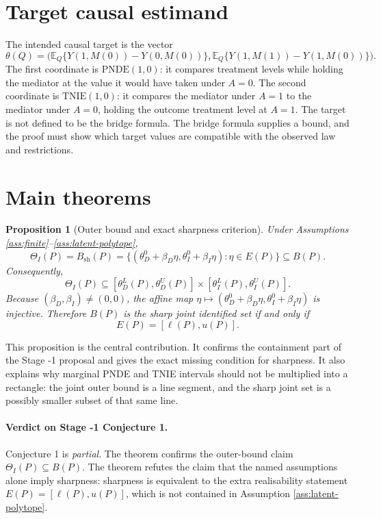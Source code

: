 \documentclass[11pt]{article}
\newcommand{\E}{\mathbb{E}}
\theoremstyle{definition}
\theoremstyle{plain}
\newtheorem{proposition}{Proposition}
\theoremstyle{remark}
\begin{document}
\section{Target causal estimand}
The intended causal target is the vector
\[
  \theta(Q)=
  \bigl(
  \E_Q\{Y(1,M(0))-Y(0,M(0))\},
  \E_Q\{Y(1,M(1))-Y(1,M(0))\}
  \bigr).
\]
The first coordinate is \(\mathrm{PNDE}(1,0)\): it compares treatment levels
while holding the mediator at the value it would have taken under \(A=0\).  The
second coordinate is \(\mathrm{TNIE}(1,0)\): it compares the mediator under
\(A=1\) to the mediator under \(A=0\), holding the outcome treatment level at
\(A=1\).  The target is not defined to be the bridge formula.  The bridge
formula supplies a bound, and the proof must show which target values are
compatible with the observed law and restrictions.

\section{Main theorems}
\begin{proposition}[Outer bound and exact sharpness criterion]\label{thm:outer-sharp}
Under Assumptions \ref{ass:finite}--\ref{ass:latent-polytope},
\[
  \Theta_I(P)=B_{\mathrm{sh}}(P)
  =\{(\theta_D^0+\beta_D\eta,\theta_I^0+\beta_I\eta):\eta\in E(P)\}
  \subseteq B(P).
\]
Consequently,
\[
  \Theta_I(P)\subseteq
  [\theta_D^L(P),\theta_D^U(P)]\times
  [\theta_I^L(P),\theta_I^U(P)].
\]
Because \((\beta_D,\beta_I)\ne(0,0)\), the affine map
\(\eta\mapsto(\theta_D^0+\beta_D\eta,\theta_I^0+\beta_I\eta)\) is injective.
Therefore \(B(P)\) is the sharp joint identified set if and only if
\[
  E(P)=[\ell(P),u(P)].
\]
\end{proposition}

This proposition is the central contribution.  It confirms the containment part
of the Stage -1 proposal and gives the exact missing condition for sharpness.
It also explains why marginal PNDE and TNIE intervals should not be multiplied
into a rectangle: the joint outer bound is a line segment, and the sharp joint
set is a possibly smaller subset of that same line.

\paragraph{Verdict on Stage -1 Conjecture 1.}
Conjecture 1 is \emph{partial}.  The theorem confirms the outer-bound claim
\(\Theta_I(P)\subseteq B(P)\).  The theorem refutes the claim that the named
assumptions alone imply sharpness: sharpness is equivalent to the extra
realisability statement \(E(P)=[\ell(P),u(P)]\), which is not contained in
Assumption \ref{ass:latent-polytope}.
\end{document}
